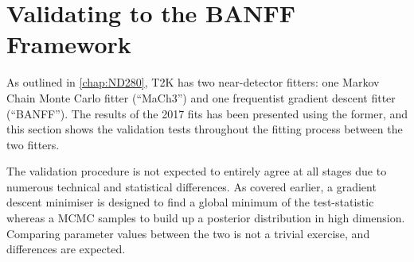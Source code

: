 \chapter{Validating to the BANFF Framework}
\label{chap:banff_valid}
As outlined in \autoref{chap:ND280}, T2K has two near-detector fitters: one Markov Chain Monte Carlo fitter (``MaCh3'') and one frequentist gradient descent fitter (``BANFF''). The results of the 2017 fits has been presented using the former, and this section shows the validation tests throughout the fitting process between the two fitters.

The validation procedure is not expected to entirely agree at all stages due to numerous technical and statistical differences. As covered earlier, a gradient descent minimiser is designed to find a global minimum of the test-statistic whereas a MCMC samples to build up a posterior distribution in high dimension. Comparing parameter values between the two is not a trivial exercise, and differences are expected. 

